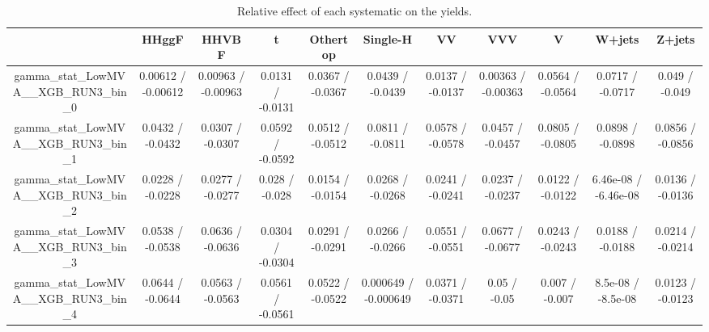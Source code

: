 \documentclass[10pt]{article}
\begin{document}
\begin{table}[htbp]
\begin{center}
\begin{tabular}{|c|c|c|c|c|c|c|c|c|c|c|}
\hline 
      & HHggF      & HHVBF      & t      & Othertop      & Single-H      & VV      & VVV      & V      & W+jets      & Z+jets \\ 
\hline 
  gamma_stat_LowMVA__XGB_RUN3_bin_0 & 0.00612 / -0.00612 & 0.00963 / -0.00963 & 0.0131 / -0.0131 & 0.0367 / -0.0367 & 0.0439 / -0.0439 & 0.0137 / -0.0137 & 0.00363 / -0.00363 & 0.0564 / -0.0564 & 0.0717 / -0.0717 & 0.049 / -0.049 \\ 
  gamma_stat_LowMVA__XGB_RUN3_bin_1 & 0.0432 / -0.0432 & 0.0307 / -0.0307 & 0.0592 / -0.0592 & 0.0512 / -0.0512 & 0.0811 / -0.0811 & 0.0578 / -0.0578 & 0.0457 / -0.0457 & 0.0805 / -0.0805 & 0.0898 / -0.0898 & 0.0856 / -0.0856 \\ 
  gamma_stat_LowMVA__XGB_RUN3_bin_2 & 0.0228 / -0.0228 & 0.0277 / -0.0277 & 0.028 / -0.028 & 0.0154 / -0.0154 & 0.0268 / -0.0268 & 0.0241 / -0.0241 & 0.0237 / -0.0237 & 0.0122 / -0.0122 & 6.46e-08 / -6.46e-08 & 0.0136 / -0.0136 \\ 
  gamma_stat_LowMVA__XGB_RUN3_bin_3 & 0.0538 / -0.0538 & 0.0636 / -0.0636 & 0.0304 / -0.0304 & 0.0291 / -0.0291 & 0.0266 / -0.0266 & 0.0551 / -0.0551 & 0.0677 / -0.0677 & 0.0243 / -0.0243 & 0.0188 / -0.0188 & 0.0214 / -0.0214 \\ 
  gamma_stat_LowMVA__XGB_RUN3_bin_4 & 0.0644 / -0.0644 & 0.0563 / -0.0563 & 0.0561 / -0.0561 & 0.0522 / -0.0522 & 0.000649 / -0.000649 & 0.0371 / -0.0371 & 0.05 / -0.05 & 0.007 / -0.007 & 8.5e-08 / -8.5e-08 & 0.0123 / -0.0123 \\ 
\hline 
\end{tabular} 
\caption{Relative effect of each systematic on the yields.} 
\end{center} 
\end{table} 
\end{document}
